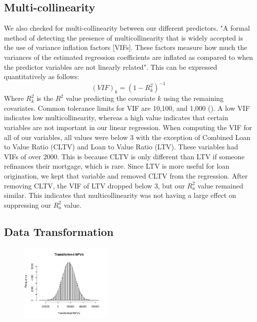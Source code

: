 \documentclass[12 pt]{uncw_thesis}
\theoremstyle{plain}
\theoremstyle{remark}
\theoremstyle{definition}
\begin{document}
\subsection{Multi-collinearity}
We also checked for multi-collinearity between our different predictors. "A formal method of detecting the presence of multicollinearity that is widely accepted is the use of variance inflation factors [VIFs]. These factors measure how much the variances of the estimated regression coefficients are inflated as compared to when the predictor variables are not linearly related"\cite{512}. This can be expressed quantitatively as follows: 
\[(VIF)_k = (1-R_k^2)^{-1}\]
Where $R_k^2$ is the $R^2$ value predicting the covariate $k$ using the remaining covariates. Common tolerance limits for VIF are 10,100, and 1,000 (\cite[p.~408-410]{512}). A low VIF indicates low multicollinearity, whereas a high value indicates that certain variables are not important in our linear regression. 
When computing the VIF for all of our variables, all values were below 3 with the exception of Combined Loan to Value Ratio (CLTV) and Loan to Value Ratio (LTV). These variables had VIFs of over 2000. This is because CLTV is only different than LTV if someone refinances their mortgage, which is rare. Since LTV is more useful for loan origination, we kept that variable and removed CLTV from the regression. After removing CLTV, the VIF of LTV dropped below 3, but our \(R^2_a\) value remained similar. This indicates that multicollinearity was not having a large effect on suppressing our \(R^2_a\) value.

\subsection{Data Transformation}
\begin{figure}
	\vspace{-2\normalbaselineskip}
	\centering
	\includegraphics[width=0.4\textwidth]{images/Transformed.jpeg}
\end{figure}
\end{document}
